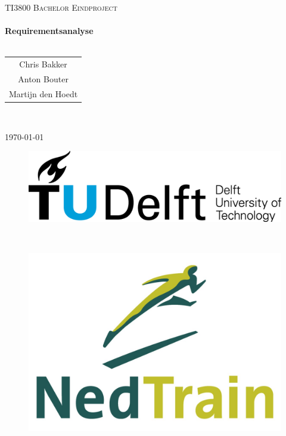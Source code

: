 
\usepackage{tikz}

\pagestyle{fancy}
\begin{titlepage}
\center
\textsc{\huge TI3800 Bachelor Eindproject}\\[1.5cm]
\HRule \\[0.4cm]
{\Huge \bfseries Requirementsanalyse}\\[0.4cm]
\HRule \\[1.5cm]
\begin{Large}
\begin{tabular}{c}
Chris Bakker\\
Anton Bouter\\
Martijn den Hoedt\\
\end{tabular}\\[2cm]
\end{Large}

{\large \today}\\[2cm]

\begin{figure}[b]
\centering
\begin{minipage}{0.4\textwidth}
\begin{flushleft}
\includegraphics[width=0.9\linewidth]{../images/TU_Delft_logo.png}
\end{flushleft}
\end{minipage}
~
\begin{minipage}{0.4\textwidth}
\begin{flushright}
\includegraphics[width=0.9\linewidth]{../images/NedTrain_logo.png}
\end{flushright}
\end{minipage}\\[2cm]
\end{figure}

\vfill

\end{titlepage}

